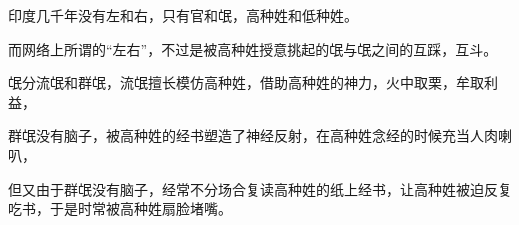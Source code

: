 \begin{zhihuanswer}
印度几千年没有左和右，只有官和氓，高种姓和低种姓。

而网络上所谓的``左右''，不过是被高种姓授意挑起的氓与氓之间的互踩，互斗。

氓分流氓和群氓，流氓擅长模仿高种姓，借助高种姓的神力，火中取栗，牟取利益，

群氓没有脑子，被高种姓的经书塑造了神经反射，在高种姓念经的时候充当人肉喇叭，

但又由于群氓没有脑子，经常不分场合复读高种姓的纸上经书，让高种姓被迫反复吃书，于是时常被高种姓扇脸堵嘴。
\end{zhihuanswer}
